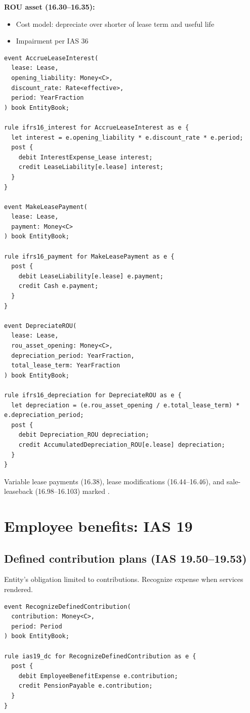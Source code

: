 \textbf{ROU asset (16.30--16.35):}
\begin{itemize}
\item Cost model: depreciate over shorter of lease term and useful life
\item Impairment per IAS 36
\end{itemize}

\begin{lstlisting}
event AccrueLeaseInterest(
  lease: Lease,
  opening_liability: Money<C>,
  discount_rate: Rate<effective>,
  period: YearFraction
) book EntityBook;

rule ifrs16_interest for AccrueLeaseInterest as e {
  let interest = e.opening_liability * e.discount_rate * e.period;
  post {
    debit InterestExpense_Lease interest;
    credit LeaseLiability[e.lease] interest;
  }
}

event MakeLeasePayment(
  lease: Lease,
  payment: Money<C>
) book EntityBook;

rule ifrs16_payment for MakeLeasePayment as e {
  post {
    debit LeaseLiability[e.lease] e.payment;
    credit Cash e.payment;
  }
}

event DepreciateROU(
  lease: Lease,
  rou_asset_opening: Money<C>,
  depreciation_period: YearFraction,
  total_lease_term: YearFraction
) book EntityBook;

rule ifrs16_depreciation for DepreciateROU as e {
  let depreciation = (e.rou_asset_opening / e.total_lease_term) * e.depreciation_period;
  post {
    debit Depreciation_ROU depreciation;
    credit AccumulatedDepreciation_ROU[e.lease] depreciation;
  }
}
\end{lstlisting}

 Variable lease payments (16.38), lease modifications
(16.44--16.46), and sale-leaseback (16.98--16.103) marked .

\section{Employee benefits: IAS 19}

\subsection{Defined contribution plans (IAS 19.50--19.53)}

Entity's obligation limited to contributions. Recognize expense when services
rendered.

\begin{lstlisting}
event RecognizeDefinedContribution(
  contribution: Money<C>,
  period: Period
) book EntityBook;

rule ias19_dc for RecognizeDefinedContribution as e {
  post {
    debit EmployeeBenefitExpense e.contribution;
    credit PensionPayable e.contribution;
  }
}
\end{lstlisting}


